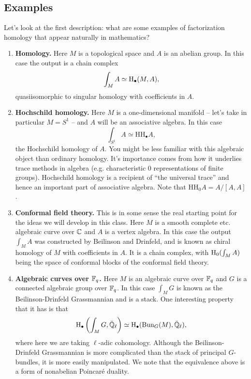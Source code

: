 \documentclass{amsart}
\begin{document}
\subsection{Examples}
Let's look at the first description: what are some examples of factorization homology
that appear naturally in mathematics?
\begin{enumerate}
    \item \textbf{Homology.} Here $M$ is a topological space and $A$ is an abelian group.
        In this case the output is a chain complex
        \begin{equation*}
            \int_M A \simeq \operatorname{H}_\bullet(M,A),
        \end{equation*}
        quasiisomorphic to singular homology with coefficients in $A$.

    \item  \textbf{Hochschild homology.} Here $M$ is a one-dimensional manifold -- let's
        take in particular $M=S^1$ -- and $A$ will be an associative algebra. In this case
        \begin{equation*}
            \int_{S^1} A \simeq \text{HH}_\bullet A,
        \end{equation*}
        the Hochschild homology of $A$.
        You might be less familiar with this algebraic object than ordinary
        homology. It's importance comes from how it underlies trace methods
        in algebra (e.g. characteristic 0 representations of finite groups).
        Hochschild homology is a recipient of ``the universal trace'' and hence
        an important part of associative algebra. Note that
        $\text{HH}_0A=A/[A,A]$.
        
    \item \textbf{Conformal field theory.} This is in some sense the real starting point
        for the ideas we will develop in this class. Here $M$ is a smooth complete etc.
        algebraic curve over $\mathbb{C}$ and $A$ is a vertex algebra. In this case
        the output $\int_M A$ was constructed by Beilinson and Drinfeld, and
        is known as chiral homology of $M$ with coefficients in $A$. It is
        a chain complex, with $\operatorname{H}_0(\int_M A)$ being the space of conformal blocks of
        the conformal field theory.

    \item \textbf{Algebraic curves over $\mathbb{F}_q$.} Here $M$ is an algebraic curve over $\mathbb{F}_q$
        and $G$ is a connected algebraic group over $\mathbb{F}_q$. In this case $\int_MG$ is known
        as the Beilinson-Drinfeld Grassmannian and is a stack. One interesting
        property that it has is that
        \begin{equation*}
            \operatorname{H}_\bullet\left(\int_M G,\bar{\mathbb{Q}}_\ell\right) \simeq \operatorname{H}_\bullet(\text{Bun}_G(M),\bar{\mathbb{Q}}_\ell),
        \end{equation*}
        where here we are taking $\ell$-adic cohomology.
        Although the Beilinson-Drinfeld Grassmannian is more complicated than the
        stack of principal $G$-bundles, it is more easily manipulated.
        We note that the equivalence above is a form of nonabelian Poincar\'e duality.


\end{enumerate}
\end{document}
